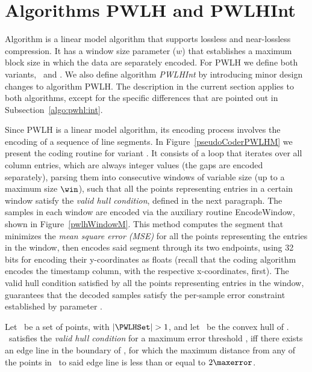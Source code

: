 

\section{Algorithms PWLH and PWLHInt}
\label{algo:pwlh}
\newcommand{\EncodeWindow}{EncodeWindow}


Algorithm \textit{\PWLHfull} \cite{coder:pwlh} is a linear model algorithm that supports lossless and near-lossless compression. It has a window size parameter ($w$) that establishes a maximum block size in which the data are separately encoded. For PWLH we define both variants, \maskalgo\ and \NOmaskalgo. We also define algorithm \textit{PWLHInt} by introducing minor design changes to algorithm PWLH. The description in the current section applies to both algorithms, except for the specific differences that are pointed out in Subsection~\ref{algo:pwhl:int}.


Since PWLH is a linear model algorithm, its encoding process involves the encoding of a sequence of line segments. In Figure~\ref{pseudoCoderPWLHM} we present the coding routine for variant \maskalgo. It consists of a loop that iterates over all column entries, which are always integer values (the gaps are encoded separately), parsing them into consecutive windows of variable size (up to a maximum size $\win$), such that all the points representing entries in a certain window satisfy the \textit{valid hull condition}, defined in the next paragraph. The samples in each window are encoded via the auxiliary routine \EncodeWindow, shown in Figure~\ref{pwlhWindowM}. This method computes the segment that minimizes the \textit{mean square error (MSE)} for all the points representing the entries in the window, then encodes said segment through its two endpoints, using 32 bits for encoding their y-coordinates as floats (recall that the coding algorithm encodes the timestamp column, with the respective x-coordinates, first). The valid hull condition satisfied by all the points representing entries in the window, guarantees that the decoded samples satisfy the per-sample error constraint established by parameter \maxerror.

\clearpage








\vspace{+5pt}
\begin{defcion}
\label{def:validHull}
Let \PWLHSet\ be a set of points, with $|\PWLHSet|>1$, and let \hull\ be the convex hull of \PWLHSet. \hull\ satisfies the \textit{valid hull condition} for a maximum error threshold \maxerror, iff there exists an edge line in the boundary of \hull, for which the maximum distance from any of the points in \hull\ to said edge line is less than or equal to $2\maxerror$.
\end{defcion}


